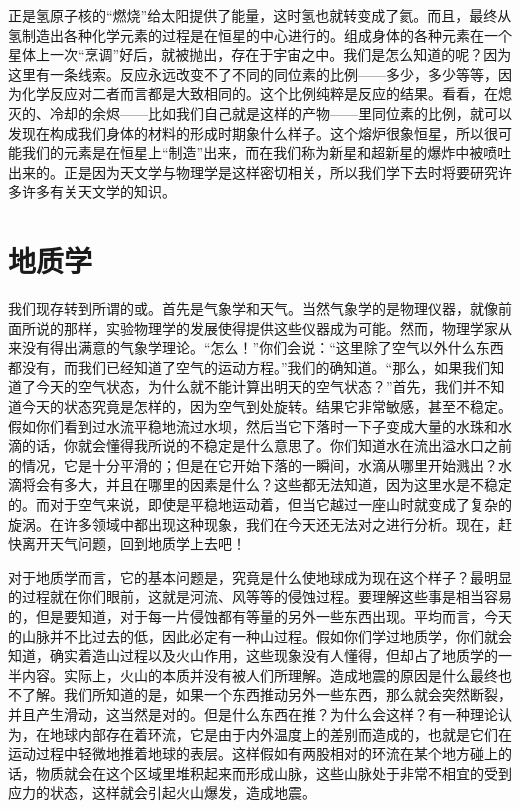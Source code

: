 正是氢原子核的“燃烧”给太阳提供了能量，这时氢也就转变成了氦。而且，最终从氢制造出各种化学元素的过程是在恒星的中心进行的。组成身体的各种元素在一个星体上一次“烹调”好后，就被抛出，存在于宇宙之中。我们是怎么知道的呢？因为这里有一条线索。反应永远改变不了不同的同位素的比例——多少，多少等等，因为化学反应对二者而言都是大致相同的。这个比例纯粹是反应的结果。看看，在熄灭的、冷却的余烬——比如我们自己就是这样的产物——里同位素的比例，就可以发现在构成我们身体的材料的形成时期象什么样子。这个熔炉很象恒星，所以很可能我们的元素是在恒星上“制造”出来，而在我们称为新星和超新星的爆炸中被喷吐出来的。正是因为天文学与物理学是这样密切相关，所以我们学下去时将要研究许多许多有关天文学的知识。



\section{地质学}

我们现存转到所谓的或。首先是气象学和天气。当然气象学的是物理仪器，就像前面所说的那样，实验物理学的发展使得提供这些仪器成为可能。然而，物理学家从来没有得出满意的气象学理论。“怎么！”你们会说：“这里除了空气以外什么东西都没有，而我们已经知道了空气的运动方程。”我们的确知道。“那么，如果我们知道了今天的空气状态，为什么就不能计算出明天的空气状态？”首先，我们并不知道今天的状态究竟是怎样的，因为空气到处旋转。结果它非常敏感，甚至不稳定。假如你们看到过水流平稳地流过水坝，然后当它下落时一下子变成大量的水珠和水滴的话，你就会懂得我所说的不稳定是什么意思了。你们知道水在流出溢水口之前的情况，它是十分平滑的；但是在它开始下落的一瞬间，水滴从哪里开始溅出？水滴将会有多大，并且在哪里的因素是什么？这些都无法知道，因为这里水是不稳定的。而对于空气来说，即使是平稳地运动着，但当它越过一座山时就变成了复杂的旋涡。在许多领域中都出现这种现象，我们在今天还无法对之进行分析。现在，赶快离开天气问题，回到地质学上去吧！

对于地质学而言，它的基本问题是，究竟是什么使地球成为现在这个样子？最明显的过程就在你们眼前，这就是河流、风等等的侵蚀过程。要理解这些事是相当容易的，但是要知道，对于每一片侵蚀都有等量的另外一些东西出现。平均而言，今天的山脉并不比过去的低，因此必定有一种山过程。假如你们学过地质学，你们就会知道，确实着造山过程以及火山作用，这些现象没有人懂得，但却占了地质学的一半内容。实际上，火山的本质并没有被人们所理解。造成地震的原因是什么最终也不了解。我们所知道的是，如果一个东西推动另外一些东西，那么就会突然断裂，并且产生滑动，这当然是对的。但是什么东西在推？为什么会这样？有一种理论认为，在地球内部存在着环流，它是由于内外温度上的差别而造成的，也就是它们在运动过程中轻微地推着地球的表层。这样假如有两股相对的环流在某个地方碰上的话，物质就会在这个区域里堆积起来而形成山脉，这些山脉处于非常不相宜的受到应力的状态，这样就会引起火山爆发，造成地震。

